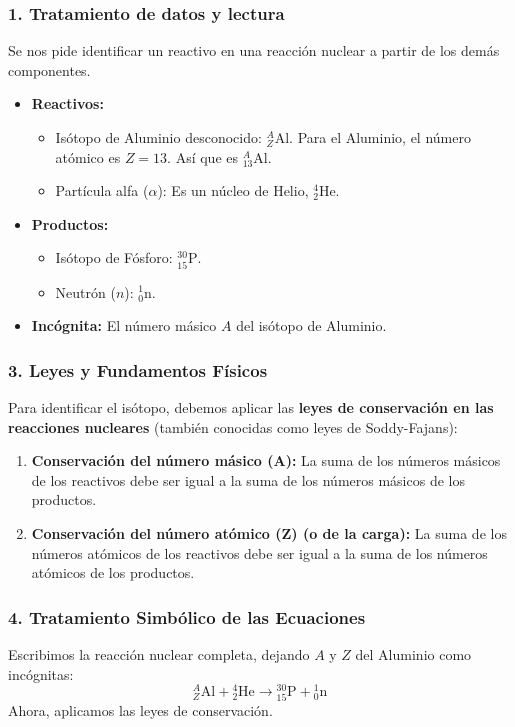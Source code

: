 \subsubsection*{1. Tratamiento de datos y lectura}
Se nos pide identificar un reactivo en una reacción nuclear a partir de los demás componentes.
\begin{itemize}
    \item \textbf{Reactivos:}
        \begin{itemize}
            \item Isótopo de Aluminio desconocido: ${}_{Z}^{A}\text{Al}$. Para el Aluminio, el número atómico es $Z=13$. Así que es ${}_{13}^{A}\text{Al}$.
            \item Partícula alfa ($\alpha$): Es un núcleo de Helio, ${}_{2}^{4}\text{He}$.
        \end{itemize}
    \item \textbf{Productos:}
        \begin{itemize}
            \item Isótopo de Fósforo: ${}_{15}^{30}\text{P}$.
            \item Neutrón ($n$): ${}_{0}^{1}\text{n}$.
        \end{itemize}
    \item \textbf{Incógnita:} El número másico $A$ del isótopo de Aluminio.
\end{itemize}

\subsubsection*{3. Leyes y Fundamentos Físicos}
Para identificar el isótopo, debemos aplicar las \textbf{leyes de conservación en las reacciones nucleares} (también conocidas como leyes de Soddy-Fajans):
\begin{enumerate}
    \item \textbf{Conservación del número másico (A):} La suma de los números másicos de los reactivos debe ser igual a la suma de los números másicos de los productos.
    \item \textbf{Conservación del número atómico (Z) (o de la carga):} La suma de los números atómicos de los reactivos debe ser igual a la suma de los números atómicos de los productos.
\end{enumerate}

\subsubsection*{4. Tratamiento Simbólico de las Ecuaciones}
Escribimos la reacción nuclear completa, dejando $A$ y $Z$ del Aluminio como incógnitas:
$$ {}_{Z}^{A}\text{Al} + {}_{2}^{4}\text{He} \to {}_{15}^{30}\text{P} + {}_{0}^{1}\text{n} $$
Ahora, aplicamos las leyes de conservación.

